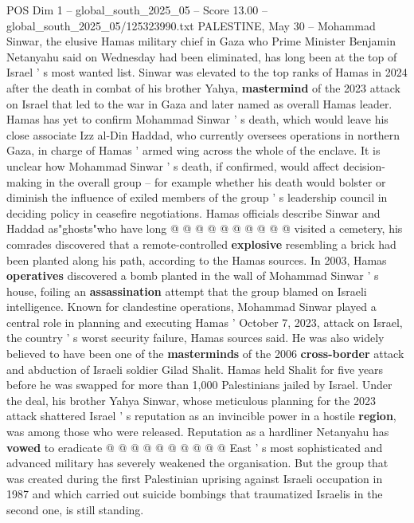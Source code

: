 \begin{textsample}{POS Dim 1 – global\_south\_2025\_05 – Score 13.00 – global\_south\_2025\_05/125323990.txt}  \label{ex:f1_pos_286}
PALESTINE, May 30 -- Mohammad Sinwar, the elusive Hamas military chief in Gaza who Prime Minister Benjamin Netanyahu said on Wednesday had been eliminated, has long been at the top of Israel ' s most wanted list.
Sinwar was elevated to the top ranks of Hamas in 2024 after the death in combat of his brother Yahya, \textbf{mastermind} of the 2023 attack on Israel that led to the war in Gaza and later named as overall Hamas leader.
Hamas has yet to confirm Mohammad Sinwar ' s death, which would leave his close associate Izz al-Din Haddad, who currently oversees operations in northern Gaza, in charge of Hamas ' armed wing across the whole of the enclave.
It is unclear how Mohammad Sinwar ' s death, if confirmed, would affect decision-making in the overall group -- for example whether his death would bolster or diminish the influence of exiled members of the group ' s leadership council in deciding policy in ceasefire negotiations.
Hamas officials describe Sinwar and Haddad as"ghosts"who have long @ @ @ @ @ @ @ @ @ @ visited a cemetery, his comrades discovered that a remote-controlled \textbf{explosive} resembling a brick had been planted along his path, according to the Hamas sources.
In 2003, Hamas \textbf{operatives} discovered a bomb planted in the wall of Mohammad Sinwar ' s house, foiling an \textbf{assassination} attempt that the group blamed on Israeli intelligence.
Known for clandestine operations, Mohammad Sinwar played a central role in planning and executing Hamas ' October 7, 2023, attack on Israel, the country ' s worst security failure, Hamas sources said.
He was also widely believed to have been one of the \textbf{masterminds} of the 2006 \textbf{cross-border} attack and abduction of Israeli soldier Gilad Shalit.
Hamas held Shalit for five years before he was swapped for more than 1,000 Palestinians jailed by Israel.
Under the deal, his brother Yahya Sinwar, whose meticulous planning for the 2023 attack shattered Israel ' s reputation as an invincible power in a hostile \textbf{region}, was among those who were released.
Reputation as a hardliner Netanyahu has \textbf{vowed} to eradicate @ @ @ @ @ @ @ @ @ @ East ' s most sophisticated and advanced military has severely weakened the organisation.
But the group that was created during the first Palestinian uprising against Israeli occupation in 1987 and which carried out suicide bombings that traumatized Israelis in the second one, is still standing.

\end{textsample}
